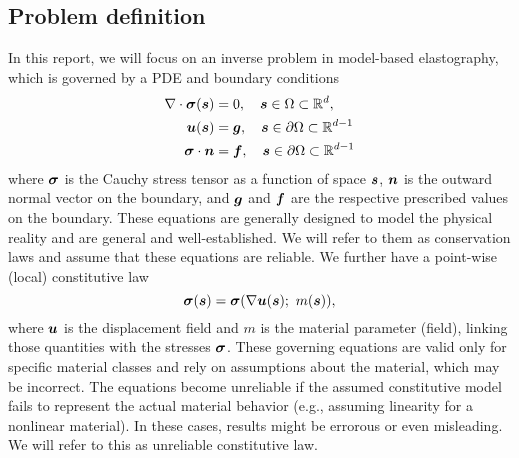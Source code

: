 \subsection{Problem definition}
In this report, we will focus on an inverse problem in model-based elastography, which is governed by a PDE and boundary conditions
\begin{align}
    \nabla \cdot \boldsymbol{\sigma}(\boldsymbol{s}) &= 0, \quad \boldsymbol{s} \in \Omega \subset \mathbb{R}^d, \label{eqn:PDE} \\
    \boldsymbol{u}(\boldsymbol{s}) &= \boldsymbol{g}, \quad \boldsymbol{s} \in \partial\Omega \subset \mathbb{R}^{d-1} \\
    \boldsymbol{\sigma} \cdot \boldsymbol{n} &= \boldsymbol{f} , \quad \boldsymbol{s} \in \partial\Omega \subset \mathbb{R}^{d-1}
\end{align}
where $\boldsymbol{\sigma}$ is the Cauchy stress tensor as a function of space $\boldsymbol{s}$, $\boldsymbol{n}$ is the outward normal vector on the boundary, and $\boldsymbol{g}$ and $\boldsymbol{f}$ are the respective prescribed values on the boundary. These equations are generally designed to model the physical reality and are general and well-established. We will refer to them as conservation laws and assume that these equations are reliable. We further have a point-wise (local) constitutive law 
\begin{equation}
    \boldsymbol{\sigma}(\boldsymbol{s}) = \boldsymbol{\sigma}(\nabla \boldsymbol{u} (\boldsymbol{s}); ~m(\boldsymbol{s})), \label{eqn:constitutive}
\end{equation}
where $\boldsymbol{u}$ is the displacement field and $m$ is the material parameter (field), linking those quantities with the stresses $\boldsymbol{\sigma}$. These governing equations are valid only for specific material classes and rely on assumptions about the material, which may be incorrect. The equations become unreliable if the assumed constitutive model fails to represent the actual material behavior (e.g., assuming linearity for a nonlinear material). In these cases, results might be errorous or even misleading. We will refer to this as unreliable constitutive law.

